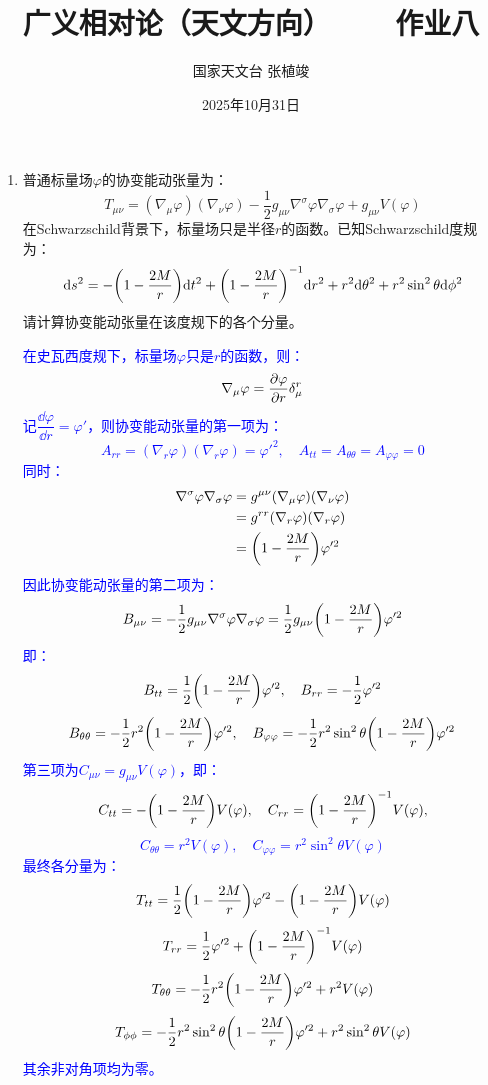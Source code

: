\documentclass[a4paper]{article}
\title{\textbf{广义相对论（天文方向）\ \ \ \ 作业八}}
\author{国家天文台 张植竣}
\date{2025年10月31日}
\begin{document}
\maketitle

\begin{enumerate}
    \item 普通标量场$\varphi$的协变能动张量为：
    \[
        T_{\mu\nu} = (\nabla_\mu \varphi)(\nabla_\nu \varphi) - \frac{1}{2} g_{\mu\nu} \nabla^\sigma \varphi \nabla_\sigma \varphi + g_{\mu\nu} V(\varphi)
    \]
    在Schwarzschild背景下，标量场只是半径$r$的函数。已知Schwarzschild度规为：
    \[
        \dd s^2 = -\qty(1 - \frac{2M}{r}) \dd t^2 + \qty(1 - \frac{2M}{r})^{-1} \dd r^2 + r^2 \dd \theta^2 + r^2 \sin^2\theta \dd \phi^2
    \]
    请计算协变能动张量在该度规下的各个分量。

    \textcolor{blue}{
    在史瓦西度规下，标量场$\varphi$只是$r$的函数，则：
    \[
        \nabla_\mu \varphi = \pdv{\varphi}{r} \delta^r_{\mu}
    \]
    记$\dfrac{\dd\varphi}{\dd r} = \varphi'$，则协变能动张量的第一项为：
    \[
        A_{rr} = (\nabla_r \varphi)(\nabla_r \varphi) = \varphi'^2,\quad A_{tt} = A_{\theta\theta} = A_{\varphi\varphi} = 0
    \]
    同时：
    \begin{align*}
        \nabla^\sigma \varphi \nabla_\sigma \varphi
        & = g^{\mu\nu} (\nabla_\mu \varphi)(\nabla_\nu \varphi) \\
        & = g^{rr} (\nabla_r \varphi)(\nabla_r \varphi) \\
        & = \qty(1 - \frac{2M}{r}) \varphi'^2
    \end{align*}
    因此协变能动张量的第二项为：
    \[
        B_{\mu\nu} = -\frac{1}{2} g_{\mu\nu} \nabla^\sigma \varphi \nabla_\sigma \varphi = \frac{1}{2} g_{\mu\nu} \qty(1 - \frac{2M}{r}) \varphi'^2
    \]
    即：
    \[
        B_{tt} = \frac{1}{2} \qty(1 - \frac{2M}{r}) \varphi'^2,\quad B_{rr} = -\frac{1}{2} \varphi'^2
    \]
    \[
        B_{\theta\theta} = -\frac{1}{2} r^2 \qty(1 - \frac{2M}{r}) \varphi'^2,\quad B_{\varphi\varphi} = -\frac{1}{2} r^2 \sin^2\theta \qty(1 - \frac{2M}{r}) \varphi'^2
    \]
    第三项为$C_{\mu\nu} = g_{\mu\nu} V(\varphi)$，即：
    \[
        C_{tt} = -\qty(1 - \frac{2M}{r}) V(\varphi),\quad C_{rr} = \qty(1 - \frac{2M}{r})^{-1} V(\varphi),
    \]
    \[
        C_{\theta\theta} = r^2 V(\varphi),\quad C_{\varphi\varphi} = r^2 \sin^2\theta V(\varphi)
    \]
    最终各分量为：
    \[
        T_{tt} = \frac{1}{2} \qty(1 - \frac{2M}{r}) \varphi'^2 - \qty(1 - \frac{2M}{r}) V(\varphi)
    \]
    \[
        T_{rr} = \frac{1}{2} \varphi'^2 + \qty(1 - \frac{2M}{r})^{-1} V(\varphi)
    \]
    \[
        T_{\theta\theta} = -\frac{1}{2} r^2 \qty(1 - \frac{2M}{r}) \varphi'^2 + r^2 V(\varphi)
    \]
    \[
        T_{\phi\phi} = -\frac{1}{2} r^2 \sin^2\theta \qty(1 - \frac{2M}{r}) \varphi'^2 + r^2 \sin^2\theta V(\varphi)
    \]
    其余非对角项均为零。
    }


\end{enumerate}
\end{document}
